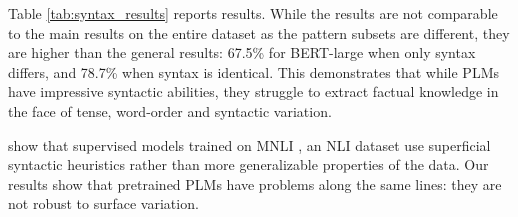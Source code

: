 


Table \ref{tab:syntax_results}
reports results.
While the results are not comparable to the main results on
the entire dataset as the pattern subsets are different,
they are higher than the general results: 67.5\% for BERT-large when only 
syntax differs, and 78.7\% when syntax is
identical. This demonstrates that while PLMs have impressive syntactic abilities, 
they struggle to extract factual knowledge in the face of
tense, word-order and syntactic variation.


\citet{mccoy2019right}  show that supervised models trained on MNLI \cite{mnli}, an NLI
dataset \cite{snli} use
superficial syntactic heuristics rather than more
generalizable properties of the data.
Our results show that pretrained PLMs have  problems along
the same lines:
they are not robust to surface variation.


